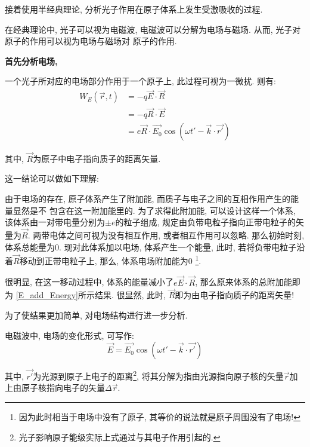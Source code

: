 \documentclass[a4paper, 11pt]{article}
\begin{document}
\begin{spacing}{1.2}
          接着使用半经典理论, 分析光子作用在原子体系上发生受激吸收的过程.

          在经典理论中, 光子可以视为电磁波, 电磁波可以分解为电场与磁场. 从而, 光子对原子的作用可以视为电场与磁场对
          原子的作用.  
          
          \textbf{首先分析电场,} 
          
          一个光子所对应的电场部分作用于一个原子上, 此过程可视为一微扰. 则有:
          \begin{equation}
            \begin{aligned}
              \label{E_add_Energy}
              W_E(\vec{r},t) &= -q\vec{E}\cdot\vec{R}\\ 
                            &= -q\vec{R}\cdot\vec{E}\\ 
                            &= e\vec{R}\cdot\vec{E_0}\cos(\omega t'-\vec{k}\cdot\vec{r'}) 
            \end{aligned}
          \end{equation}
          
          其中, $\vec{R}$为原子中电子指向质子的距离矢量.
          
          这一结论可以做如下理解: 
          
          由于电场的存在, 原子体系产生了附加能, 而质子与电子之间的互相作用产生的能量显然是不
          包含在这一附加能里的. 为了求得此附加能, 可以设计这样一个体系, 该体系由一对带电量分别为$\pm{}e$的粒子组成, 
          规定由负带电粒子指向正带电粒子的矢量为$\vec{R}$.
          两带电体之间可视为没有相互作用, 或者相互作用可以忽略. 那么初始时刻, 体系总能量为0. 现对此体系加以电场,
          体系产生一个能量, 此时, 若将负带电粒子沿着$\vec{R}$移动到正带电粒子上, 那么, 体系电场附加能为0
          \footnote{因为此时相当于电场中没有了原子, 其等价的说法就是原子周围没有了电场!}.

          很明显, 在这一移动过程中, 体系的能量减小了$e\vec{E}\cdot\vec{R}$, 那么原来体系的总附加能即为
          \eqref{E_add_Energy}所示结果. 很显然, 此时, $\vec{R}$即为由电子指向质子的距离矢量! 
          
          为了使结果更加简单, 对电场结构进行进一步分析. 

          电磁波中, 电场的变化形式, 可写作:       
          \begin{equation}
            \vec{E} = \vec{E_0}\cos(\omega t'-\vec{k}\cdot\vec{r'}) 
          \end{equation}

          其中, $\vec{r'}$为光源到原子上电子的距离\footnote{光子影响原子能级实际上式通过与其电子作用引起的.},
          将其分解为指由光源指向原子核的矢量$\vec{r}$加上由原子核指向电子的矢量$\Delta\vec{r}$. 


\end{spacing}
\end{document}
